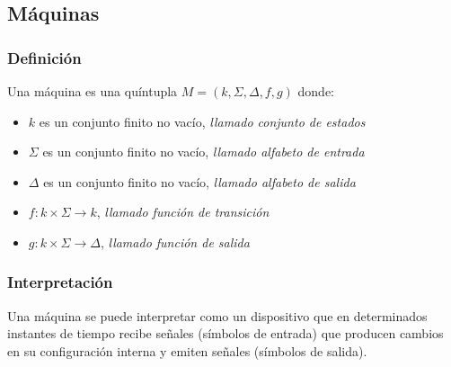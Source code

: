 \subsection{Máquinas}
\subsubsection{Definición}
Una máquina es una quíntupla $M=(k,\Sigma,\Delta,f,g)$ donde:
\begin{itemize}
\item $k$ es un conjunto finito no vacío, \textit{llamado conjunto de estados}
\item $\Sigma$ es un conjunto finito no vacío, \textit{llamado alfabeto de entrada}
\item $\Delta$ es un conjunto finito no vacío, \textit{llamado alfabeto de salida}
\item $f:k\times\Sigma\rightarrow k$, \textit{llamado función de transición}
\item $g:k\times\Sigma\rightarrow \Delta$, \textit{llamado función de salida}
\end{itemize}
\subsubsection{Interpretación}
Una máquina se puede interpretar como un dispositivo que en determinados instantes de tiempo recibe señales (símbolos de entrada) que producen cambios en su configuración interna y emiten señales (símbolos de salida).
\begin{center}
\end{center}
